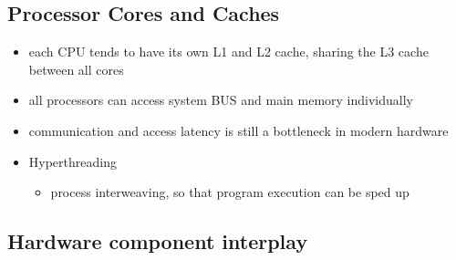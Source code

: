 \documentclass[
]{article}
\providecommand{\tightlist}{%
  \setlength{\itemsep}{0pt}\setlength{\parskip}{0pt}}
\begin{document}
\hypertarget{processor-cores-and-caches}{%
\subsection{Processor Cores and
Caches}\label{processor-cores-and-caches}}

\begin{itemize}
\item
  each CPU tends to have its own L1 and L2 cache, sharing the L3 cache
  between all cores
\item
  all processors can access system BUS and main memory individually
\item
  communication and access latency is still a bottleneck in modern
  hardware
\item
  Hyperthreading

  \begin{itemize}
  \tightlist
  \item
    process interweaving, so that program execution can be sped up
  \end{itemize}
\end{itemize}

\hypertarget{hardware-component-interplay}{%
\subsection{Hardware component
interplay}\label{hardware-component-interplay}}
\end{document}
